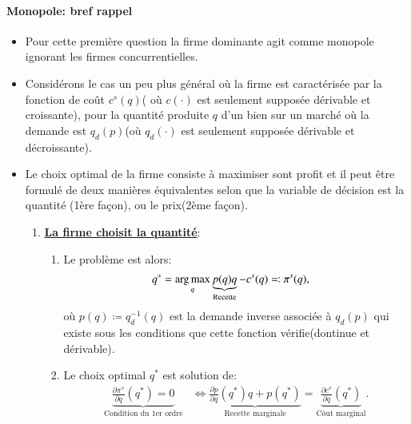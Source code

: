 \begin{frame}
  [allowframebreaks]{\insertsection}
  \framesubtitle{Monopole: bref rappel}
  \begin{itemize}
  \item Pour cette première question la firme dominante agit comme monopole ignorant les firmes concurrentielles.
  \item Considérons le cas un peu plus général où la firme est caractérisée par la fonction de coût $c^s(q)$( où $c(\cdot)$ est seulement supposée dérivable et croissante), pour la quantité produite $q$ d'un bien sur un marché où la demande est $q_d(p)$(où $q_d(\cdot)$ est seulement supposée dérivable et décroissante).
  \item Le choix optimal de la firme consiste à maximiser sont profit et il peut être formulé de deux manières équivalentes selon que la variable de décision est la quantité (1ère façon), ou le prix(2ème façon).
  \begin{enumerate}
  \item \textbf{\underline{La firme choisit la quantité}}:
  \begin{enumerate}[$\cdot$]
  \item Le problème est alors:
  \begin{align}
  q^* &= \argmax_{q} \underbrace{p(q)q}_{\text{Recette}} - c^s(q)\eqqcolon \pi^s(q), \label{eq7}
  \end{align}
  où $p(q)\coloneqq q_d^{-1}(q)$ est la demande inverse associée à $q_d(p)$ qui existe sous les conditions que cette fonction vérifie(dontinue et dérivable).
  \item  Le choix optimal $q^*$ est solution de:
  \begin{align}
  \underbrace{\frac{\partial \pi^s}{\partial q}(q^*) = 0}_{\text{Condition du 1er ordre}} &\Leftrightarrow   \underbrace{\frac{\partial p}{\partial q}(q^*) q + p(q^*)}_{\text{Recette marginale}} = \underbrace{\frac{\partial c^s}{\partial q}(q^*)}_{\text{Côut marginal}}. 
  \label{eq8}
  \end{align}
  \end{enumerate}


\end{enumerate}
\end{itemize}
\end{frame}
